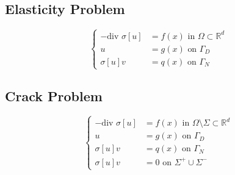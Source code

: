 \documentclass[a4paper,12pt]{article}
\newcommand{\R}{\mathbb{R}}
\begin{document}
\subsection{Elasticity Problem}
\begin{equation}\nonumber
\begin{cases}
-\text{div } \sigma[u] &= f(x) \text{ in } \Omega \subset \R^d\\
u &= g(x) \text{ on } \Gamma_D\\
\sigma[u]v &= q(x) \text{ on } \Gamma_N
\end{cases}
\end{equation}
\subsection{Crack Problem}
\begin{equation}\nonumber
\begin{cases}
-\text{div } \sigma[u] &= f(x) \text{ in } \Omega \setminus \Sigma \subset \R^d\\
u &= g(x) \text{ on } \Gamma_D\\
\sigma[u]v &= q(x) \text{ on } \Gamma_N\\
\sigma[u]v &= 0 \text{ on } \Sigma^+ \cup \Sigma^-
\end{cases}
\end{equation}
\end{document}
